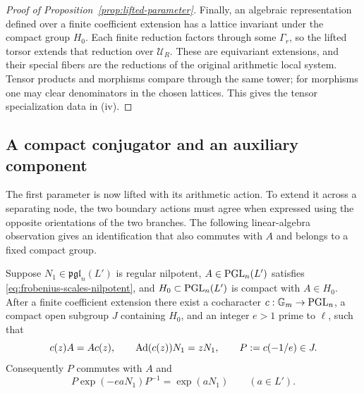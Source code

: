 \begin{proof}[Proof of Proposition~\ref{prop:lifted-parameter}]
Finally, an algebraic representation defined over a finite coefficient
extension has a lattice invariant under the compact group $H_0$.
Each finite reduction factors through some $\Gamma_r$, so the lifted
torsor extends that reduction over $\mathscr U_R$.  These are
equivariant extensions, and their special fibers are the reductions
of the original arithmetic local system.  Tensor products and
morphisms compare through the same tower; for morphisms one may
clear denominators in the chosen lattices.  This gives the tensor
specialization data in (iv).
\end{proof}

\subsection{A compact conjugator and an auxiliary component}

The first parameter is now lifted with its arithmetic action.  To
extend it across a separating node, the two boundary actions must
agree when expressed using the opposite orientations of the two
branches.  The following linear-algebra observation gives an
identification that also commutes with $A$ and belongs to a fixed
compact group.

\begin{lemma}\label{lem:compact-conjugator}
Suppose $N_1\in\mathfrak{pgl}_n(L')$ is regular nilpotent,
$A\in\mathrm{PGL}_n(L')$ satisfies \eqref{eq:frobenius-scales-nilpotent}, and
$H_0\subset\mathrm{PGL}_n(L')$ is compact with $A\in H_0$.  After a finite
coefficient extension there exist a cocharacter
$c:\mathbb G_m\to\mathrm{PGL}_n$, a compact open subgroup $J$ containing
$H_0$, and an integer $e>1$ prime to $\ell$, such that
\begin{equation}\label{eq:compact-conjugator}
 c(z)A=Ac(z),\qquad \operatorname{Ad}(c(z))N_1=zN_1,
 \qquad P:=c(-1/e)\in J.
\end{equation}
Consequently $P$ commutes with $A$ and
\begin{equation}\label{eq:inverse-boundary-conjugation}
 P\exp(-e aN_1)P^{-1}=\exp(aN_1)
 \qquad(a\in L').
\end{equation}
\end{lemma}

